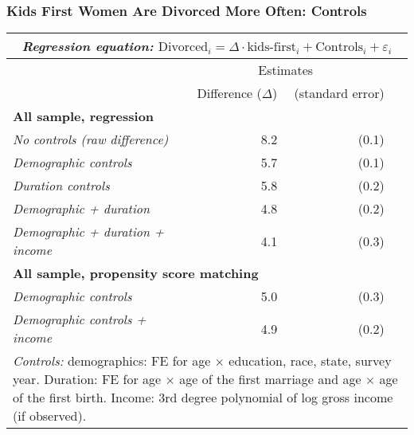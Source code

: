 \documentclass[aspectratio=169]{beamer}
\begin{document}
\begin{frame}
\frametitle{Kids First Women Are Divorced More Often: Controls}
\begin{center}
\begin{tabular}{l r r r }
\multicolumn{4}{c}{\textit{Regression equation:} $\text{Divorced}_i = \Delta \cdot \text{kids-first}_i + \text{Controls}_i + \varepsilon_i$} \\\hline
\hline
& \multicolumn{2}{c}{Estimates}  \\
& Difference ($\Delta$) & (standard error)  \\\hline
\multicolumn{4}{l}{\textbf{All sample, regression}} \\\hline
\textit{No controls (raw difference) }& 8.2 & (0.1)  \\
\textit{Demographic controls }& 5.7 & (0.1)  \\
\textit{Duration controls} &  5.8 & (0.2)  \\
\textit{Demographic + duration} &  4.8 & (0.2)  \\
\textit{Demographic + duration + income} & 4.1 & (0.3)  \\\hline
\multicolumn{4}{l}{\textbf{All sample, propensity score matching}} \\\hline
\textit{Demographic controls} & 5.0 & (0.3)  \\
\textit{Demographic controls + income} & 4.9 & (0.2)  \\\hline
\multicolumn{4}{p{0.825\linewidth}}{\footnotesize \textit{Controls:} demographics: FE for age $\times$ education, race, state, survey year. Duration: FE for age $\times$ age of the first marriage and age $\times$ age of the first birth.  Income: 3rd degree polynomial of log gross income (if observed).}\\\hline\hline
\end{tabular}
\end{center}
\end{frame}
\end{document}
